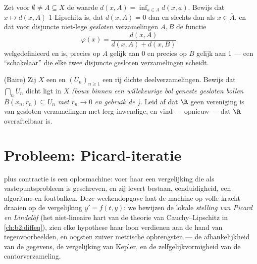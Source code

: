 \begin{exercise}[$\star\star$]\label{exo:b2:metric:11}
Zet voor $\emptyset \neq A \subseteq X$ de waarde $d(x, A) =
\inf_{a \in A} d(x, a)$. Bewijs dat $x \mapsto d(x, A)$
$1$-Lipschitz is, dat $d(x, A) = 0$ dan en slechts dan als $x \in
\overline A$, en dat voor disjuncte niet-lege \emph{gesloten}
verzamelingen $A, B$ de functie
\[
\varphi(x) = \frac{d(x, A)}{d(x, A) + d(x, B)}
\]
welgedefinieerd en  is, precies op $A$ gelijk aan $0$ en
precies op $B$ gelijk aan $1$ --- een  ``schakelaar'' die
elke twee disjuncte gesloten verzamelingen scheidt.
\end{exercise}

\begin{exercise}[$\star\star\star$]\label{exo:b2:metric:12}
(Baire) Zij $X$ een  en $(U_n)_{n\geq1}$
een rij dichte  deelverzamelingen. Bewijs dat $\bigcap_n U_n$
dicht ligt in $X$ \emph{(bouw binnen een willekeurige bol geneste
gesloten bollen $\overline B(x_n, r_n) \subseteq U_n$ met $r_n \to
0$ en gebruik de )}. Leid af dat $\R$ geen 
vereniging is van gesloten verzamelingen met leeg inwendige, en
vind --- opnieuw --- dat $\R$ overaftelbaar is.
\end{exercise}

\section{Probleem: Picard-iteratie}

 plus contractie is een oplosmachine: voer haar een
vergelijking die als vastepuntsprobleem is geschreven, en zij levert
bestaan, eenduidigheid, een algoritme en foutbalken. Deze
weekendopgave laat de machine op volle kracht draaien op de
vergelijking $y' = f(t, y)$: we bewijzen de lokale \emph{stelling
van Picard en Lindelöf} (het niet-lineaire hart van de theorie van
Cauchy--Lipschitz in \cref{ch:b2:diffeq}), zien elke hypothese haar
loon verdienen aan de hand van tegenvoorbeelden, en oogsten
zuiver metrische opbrengsten --- de  afhankelijkheid van de
gegevens, de vergelijking van Kepler, en de zelfgelijkvormigheid
van de cantorverzameling.

